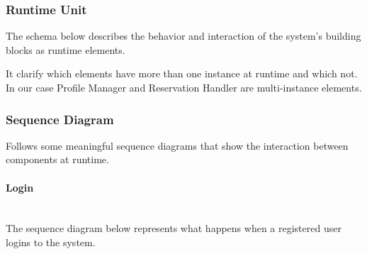 \documentclass{article}
\begin{document}
			\subsubsection{Runtime Unit}
			The schema below describes the behavior and interaction of the system's building blocks as runtime elements.
			\begin{minipage}{\linewidth}
				\vspace{5mm} %
				\vspace{5mm} %
			\end{minipage}
			It clarify which elements have more than one instance at runtime and which not. In our case Profile Manager and Reservation Handler are multi-instance elements.
			\pagebreak
			\subsubsection{Sequence Diagram}
			Follows some meaningful sequence diagrams that show the interaction between components at runtime.
				\paragraph{Login} \mbox{}\\
				The sequence diagram below represents what happens when a registered user logins to the system.\\
				\begin{minipage}{\linewidth}
					\vspace{5mm}
					\vspace{5mm}
				\end{minipage}
				
\end{document}
